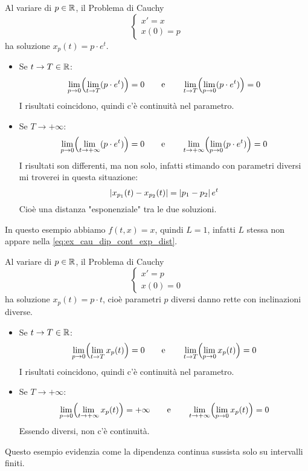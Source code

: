 \begin{example}
	Al variare di $p \in \mathbb{R}$, il Problema di Cauchy
	\begin{equation*}
		\begin{cases}
			x' = x\\
			x(0) = p
		\end{cases}
	\end{equation*}
	ha soluzione $x_p(t) = p \cdot e^t$.
	\begin{itemize}
		\item Se $t \to T \in \mathbb{R}$:
		$$\lim_{p \to 0}\Bigl(\lim_{t \to T} (p \cdot e^t)\Bigr) = 0 \qquad\text{e}\qquad \lim_{t \to T}\Bigl(\lim_{p \to 0} (p \cdot e^t)\Bigr) = 0$$
		I risultati coincidono, quindi c'è continuità nel parametro.
		\item Se $T \to +\infty$:
		$$\lim_{p \to 0}\Bigl(\lim_{t \to +\infty} (p \cdot e^t)\Bigr) = 0 \qquad\text{e}\qquad \lim_{t \to +\infty}\Bigl(\lim_{p \to 0} (p \cdot e^t)\Bigr) = 0$$
		I risultati son differenti, ma non solo, infatti stimando con parametri diversi mi troverei in questa situazione:
		\begin{equation}
			\label{eq:ex_cau_dip_cont_exp_dist}
			\left|x_{p_1}(t) - x_{p_2}(t)\right| = \left|p_1-p_2\right|e^t
		\end{equation}
		Cioè una distanza "esponenziale" tra le due soluzioni.
	\end{itemize}
	\begin{note}
		In questo esempio abbiamo $f(t,x) = x$, quindi $L = 1$, infatti $L$ stessa non appare nella \cref{eq:ex_cau_dip_cont_exp_dist}.
	\end{note}
\end{example}
\begin{example}
	Al variare di $p \in \mathbb{R}$, il Problema di Cauchy
	\begin{equation*}
		\begin{cases}
			x' = p\\
			x(0) = 0
		\end{cases}
	\end{equation*}
	ha soluzione $x_p(t) = p \cdot t$, cioè parametri $p$ diversi danno rette con inclinazioni diverse.
	\begin{itemize}
		\item Se $t \to T \in \mathbb{R}$:
		$$\lim_{p \to 0}\Bigl(\lim_{t \to T} x_p(t)\Bigr)=0 \qquad\text{e}\qquad \lim_{t \to T}\Bigl(\lim_{p \to 0} x_p(t)\Bigr)=0$$
		I risultati coincidono, quindi c'è continuità nel parametro.
		\item Se $T \to +\infty$:
		$$\lim_{p \to 0}\Bigl(\lim_{t \to +\infty} x_p(t)\Bigr)=+\infty \qquad\text{e}\qquad \lim_{t \to +\infty}\Bigl(\lim_{p \to 0} x_p(t)\Bigr)=0$$
		Essendo diversi, non c'è continuità.
	\end{itemize}
	\begin{note}
		Questo esempio evidenzia come la dipendenza continua sussista solo su intervalli finiti.
	\end{note}
\end{example}

